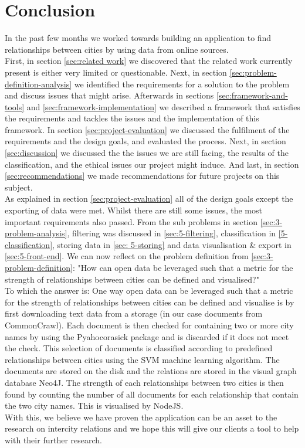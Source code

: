 \chapter{Conclusion}
In the past few months we worked towards building an application to find relationships between cities by using data from online sources.  \\

First, in section \ref{sec:related work} we discovered that the related work currently present is either very limited or questionable. Next, in section \ref{sec:problem-definition-analysis} we identified the requirements for a solution to the problem and discuss issues that might arise. Afterwards in sections \ref{sec:framework-and-tools} and \ref{sec:framework-implementation} we described a framework that satisfies the requirements and tackles the issues and the implementation of this framework. In section \ref{sec:project-evaluation} we discussed the fulfilment of the requirements and the design goals, and evaluated the process. Next, in section \ref{sec:discussion} we discussed the the issues we are still facing, the results of the classification, and the ethical issues our project might induce. And last, in section \ref{sec:recommendations} we made recommendations for future projects on this subject. \\

As explained in section \ref{sec:project-evaluation} all of the design goals except the exporting of data were met. Whilst there are still some issues, the most important requirements also passed. From the sub problems in section \ref{sec:3-problem-analysis}, filtering was discussed in \ref{sec:5-filtering}, classification in \ref{5-classification}, storing data in \ref{sec: 5-storing} and data visualisation \& export in \ref{sec:5-front-end}. We can now reflect on the problem definition from \ref{sec:3-problem-definition}: "How can open data be leveraged such that a metric for the strength of relationships between cities can be defined and visualised?" \\

To which the answer is: One way open data can be leveraged such that a metric for the strength of relationships between cities can be defined and visualise is by first downloading text data from a storage (in our case documents from CommonCrawl). Each document is then checked for containing two or more city names by using the Pyahocorasick package and is discarded if it does not meet the check. This selection of documents is classified according to predefined relationships between cities using the SVM machine learning algorithm. The documents are stored on the disk and the relations are stored in the visual graph database Neo4J. The strength of each relationships between two cities is then found by counting the number of all documents for each relationship that contain the two city names. This is visualised by NodeJS. \\

With this, we believe we have proven the application can be an asset to the research on intercity relations and we hope this will give our clients a tool to help with their further research. 

